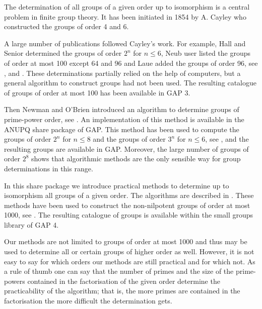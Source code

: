 

The determination of all groups of a given order up to isomorphism
is a central problem in finite group theory. It has been initiated
in 1854 by A. Cayley who constructed the groups of order 4 and 6.

A large number of publications followed Cayley's work. For example,
Hall and Senior determined the groups of order $2^n$ for $n \leq 6$,
Neub{ u}ser listed the groups of order at most 100 except 64 and 96
and Laue added the groups of order 96, see \cite{HS64}, \cite{Neu67}
and \cite{Lau82}. These determinations partially relied on the
help of computers, but a general algorithm to construct groups had
not been used. The resulting catalogue of groups of order at most
100 has been available in GAP 3.

Then Newman and O'Brien introduced an algorithm to determine
groups of prime-power order, see \cite{OBr90}. An implementation 
of this method is available in the ANUPQ share package of GAP. 
This method has been used to compute the groups of order $2^n$ for 
$n \leq 8$ and the groups of order $3^n$ for $n \leq 6$, see
\cite{OBr88}, and the resulting groups are available in GAP.
Moreover, the large number of groups of order $2^8$ shows that
algorithmic methods are the only sensible way for group determinations
in this range.

In this share package we introduce practical methods to determine
up to isomorphism all groups of a given order. The algorithms 
are described in \cite{BE99}. These methods have been used to 
construct the non-nilpotent groups of order at most 1000, see 
\cite{BE1000}. The resulting catalogue of groups is available within
the small groups library of GAP 4. 

Our methods are not limited to groups of order at most 1000
and thus may be used to determine all or certain groups of 
higher order as well. However, it is not easy to say for 
which orders our methods are still practical and for which
not. As a rule of thumb one can say that the number of 
primes and the size of the prime-powers contained in the 
factorisation of the given order determine the practicability 
of the algorithm; that is, the more primes are contained in
the factorisation the more difficult the determination gets. 

